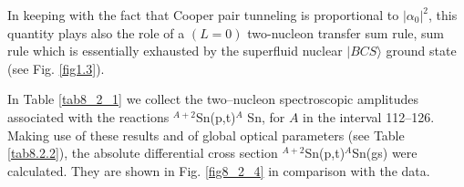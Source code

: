 In keeping with the fact that Cooper pair tunneling is proportional to $|\alpha_0|^2$, this quantity plays also the
role of a $(L=0)$ two-nucleon
transfer sum rule, sum rule which is essentially exhausted by the superfluid nuclear $|BCS\rangle$ ground state (see Fig. \ref{fig1.3}). 
%


In Table \ref{tab8_2_1} we collect the two--nucleon spectroscopic amplitudes associated with  the reactions  
$^{A+2}$Sn(p,t)$^A$ Sn, for $A$ in the interval 112--126. Making use of these results and of  global optical parameters (see Table \ref{tab8.2.2}), the absolute differential cross section $^{A+2}$Sn(p,t)$^A$Sn(gs) were calculated. They are shown in Fig. \ref{fig8_2_4} in comparison with the data.

